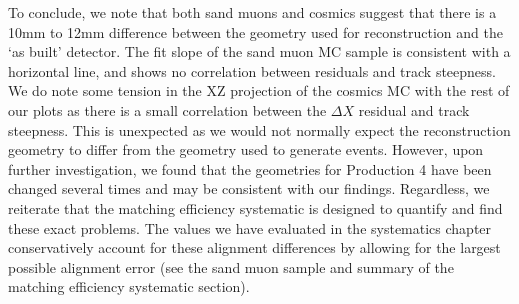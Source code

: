 To conclude, we note that both sand muons and cosmics suggest that there is a 10mm to 12mm difference between the geometry used for reconstruction and the `as built' detector. The fit slope of the sand muon MC sample is consistent with a horizontal line, and shows no correlation between residuals and track steepness. We do note some tension in the XZ projection of the cosmics MC with the rest of our plots as there is a small correlation between the $\Delta X$ residual and track steepness. This is unexpected as we would not normally expect the reconstruction geometry to differ from the geometry used to generate events. However, upon further investigation, we found that the geometries for Production 4 have been changed several times and may be consistent with our findings. Regardless, we reiterate that the matching efficiency systematic is designed to quantify and find these exact problems. The values we have evaluated in the systematics chapter conservatively account for these alignment differences by allowing for the largest possible alignment error (see the sand muon sample and summary of the matching efficiency systematic section). 

